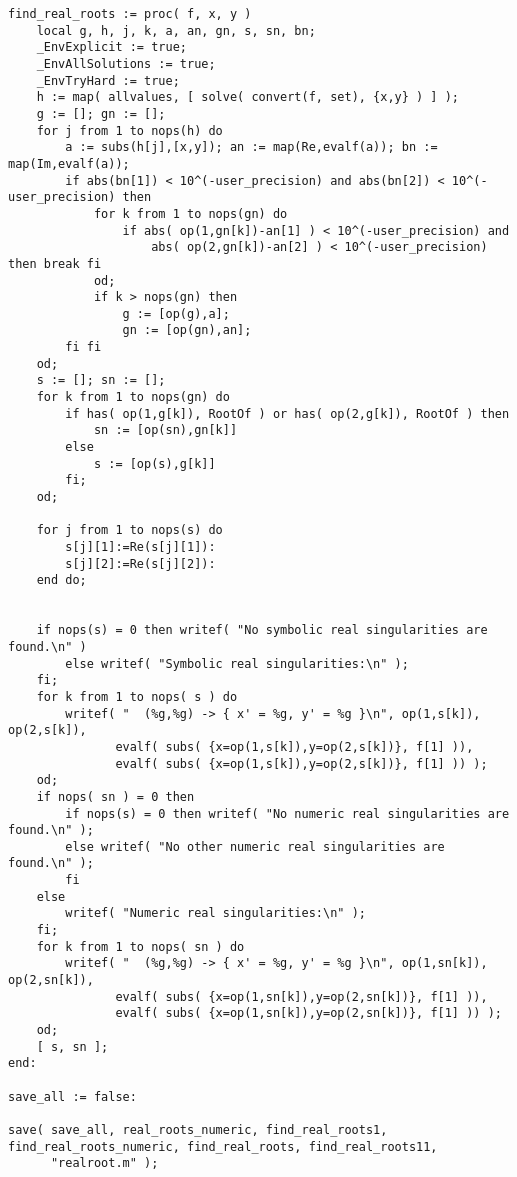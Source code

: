 \documentclass[a4paper,10pt]{article}
\begin{document}
\begin{lstlisting}[name=realroot]
find_real_roots := proc( f, x, y )
    local g, h, j, k, a, an, gn, s, sn, bn;
    _EnvExplicit := true;
    _EnvAllSolutions := true;
    _EnvTryHard := true;
    h := map( allvalues, [ solve( convert(f, set), {x,y} ) ] );
    g := []; gn := [];
    for j from 1 to nops(h) do
        a := subs(h[j],[x,y]); an := map(Re,evalf(a)); bn := map(Im,evalf(a));
        if abs(bn[1]) < 10^(-user_precision) and abs(bn[2]) < 10^(-user_precision) then
            for k from 1 to nops(gn) do
                if abs( op(1,gn[k])-an[1] ) < 10^(-user_precision) and
                    abs( op(2,gn[k])-an[2] ) < 10^(-user_precision) then break fi
            od;
            if k > nops(gn) then
                g := [op(g),a];
                gn := [op(gn),an];
        fi fi
    od;
    s := []; sn := [];
    for k from 1 to nops(gn) do
        if has( op(1,g[k]), RootOf ) or has( op(2,g[k]), RootOf ) then
            sn := [op(sn),gn[k]]
        else
            s := [op(s),g[k]]
        fi;
    od;

    for j from 1 to nops(s) do
        s[j][1]:=Re(s[j][1]):
        s[j][2]:=Re(s[j][2]):
    end do;


    if nops(s) = 0 then writef( "No symbolic real singularities are found.\n" )
        else writef( "Symbolic real singularities:\n" );
    fi;
    for k from 1 to nops( s ) do
        writef( "  (%g,%g) -> { x' = %g, y' = %g }\n", op(1,s[k]), op(2,s[k]),
               evalf( subs( {x=op(1,s[k]),y=op(2,s[k])}, f[1] )),
               evalf( subs( {x=op(1,s[k]),y=op(2,s[k])}, f[1] )) );
    od;
    if nops( sn ) = 0 then
        if nops(s) = 0 then writef( "No numeric real singularities are found.\n" );
        else writef( "No other numeric real singularities are found.\n" );
        fi
    else
        writef( "Numeric real singularities:\n" );
    fi;
    for k from 1 to nops( sn ) do
        writef( "  (%g,%g) -> { x' = %g, y' = %g }\n", op(1,sn[k]), op(2,sn[k]),
               evalf( subs( {x=op(1,sn[k]),y=op(2,sn[k])}, f[1] )),
               evalf( subs( {x=op(1,sn[k]),y=op(2,sn[k])}, f[1] )) );
    od;
    [ s, sn ];
end:

save_all := false:

save( save_all, real_roots_numeric, find_real_roots1, find_real_roots_numeric, find_real_roots, find_real_roots11,
      "realroot.m" );
\end{lstlisting}
\end{document}
